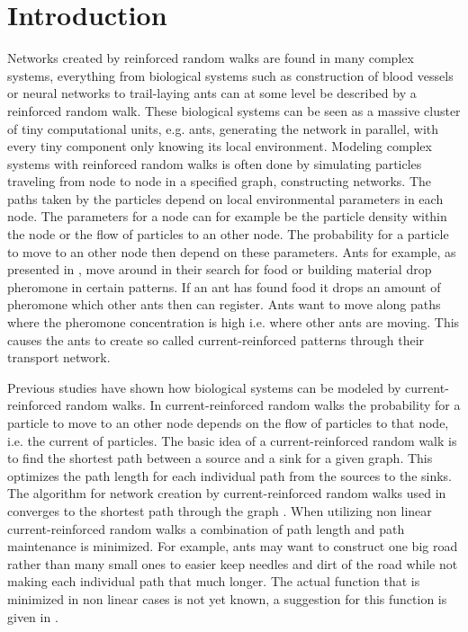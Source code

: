 \section{Introduction}
\label{sec:introduction}
Networks created by reinforced random walks are found in many complex systems, everything from biological systems such as construction of blood vessels or neural networks to trail-laying ants can at some level be described by a reinforced random walk. These biological systems can be seen as a massive cluster of tiny computational units, e.g. ants, generating the network in parallel, with every tiny component only knowing its local environment. Modeling complex systems with reinforced random walks is often done by simulating particles traveling from node to node in a specified graph, constructing networks. The paths taken by the particles depend on local environmental parameters in each node. The parameters for a node can for example be the particle density within the node or the flow of particles to an other node. The probability for a particle to move to an other node then depend on these parameters. Ants for example, as presented in \cite{Schweitzer1997153}, move around in their search for food or building material drop pheromone in certain patterns. If an ant has found food it drops an amount of pheromone which other ants then can register. Ants want to move along paths where the pheromone concentration is high i.e. where other ants are moving. This causes the ants to create so called current-reinforced patterns through their transport network.

Previous studies have shown how biological systems can be modeled by current-reinforced random walks. In current-reinforced random walks the probability for a particle to move to an other node depends on the flow of particles to that node, i.e. the current of particles. The basic idea of a current-reinforced random walk is to find the shortest path between a source and a sink for a given graph. This optimizes the path length for each individual path from the sources to the sinks. The algorithm for network creation by current-reinforced random walks used in \cite{Sumpter} converges to the shortest path through the graph \cite{Ito}. When utilizing non linear current-reinforced random walks a combination of path length and path maintenance is minimized. For example, ants may want to construct one big road rather than many small ones to easier keep needles and dirt of the road while not making each individual path that much longer. The actual function that is minimized in non linear cases is not yet known, a suggestion for this function is given in \cite{Sumpter}.

